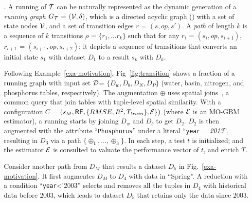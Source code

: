 . 
A running of ${\mathcal T}$ can be 
naturally represented 
as the dynamic generation of a {\em running graph} $G_{\mathcal T}$ = $({\mathcal V}, \delta)$, which is a 
directed acyclic graph 
(\dag) with a set of state nodes 
${\mathcal V}$, and a set of transition edges 
$r$ = $(s, op, s')$. 
A {\em path} of length $k$ is a sequence of 
$k$ transitions $\rho$ = 
$\{r_1, \ldots r_k\}$ 
such that for 
any $r_i$ = $(s_i,op,s_{i+1})$, 
$r_{i+1}$ = $(s_{i+1},op,s_{i+2})$; \ie 
it depicts a sequence of transitions 
that converts an initial state 
$s_1$ with dataset $D_1$ to 
a result $s_k$ with $D_k$. 




\begin{example}
\label{exa-tg}
Following Example~\ref{exa-motivation}, 
Fig~\ref{fig:transition} shows a fraction of a running graph with input set ${\mathcal D}$=
$\{D_w, D_b, D_N, D_P\}$ (water, basin, nitrogen, and phosphorus tables, respectively). 
The augmentation 
$\oplus$ uses
spatial joins~\cite{vsidlauskas2014spatial},
a common query 
that join tables with tuple-level spatial similarity. 
With a configuration 
$C$ = $(s_M, {\mathsf{RF}}, \{RMSE, R^2, T_{train}\}, {\mathcal E}\})$ (where ${\mathcal E}$ is an MO-GBM estimator), a running starts by 
joining %
$D_w$ and $D_b$
to get $D_2$. 
$D_2$ is then augmented with the attribute 
``\texttt{Phosphorus}'' 
under 
a literal 
``\texttt{year} = {\em 2013}'', resulting in $D_3$ via a path $\{\oplus_1, \ldots, \oplus_3\}$. 
In each step, a test $t$ is initialized; 
and the estimator ${\mathcal E}$ 
is consulted to valuate the 
performance vector of $t$, and enrich $T$. 

Consider another path 
from $D_M$ that results a dataset $D_5$ in Fig.~\ref{exa-motivation}.  
It first
augmentes $D_M$ to $D_4$ 
with data in ``Spring''. 
A reduction with a condition 
``\texttt{year}<'2003'' selects 
and removes all the tuples 
in $D_4$ with historical data before $2003$, 
which leads to 
dataset $D_5$ that retains only 
the data since $2003$. 
\end{example}



